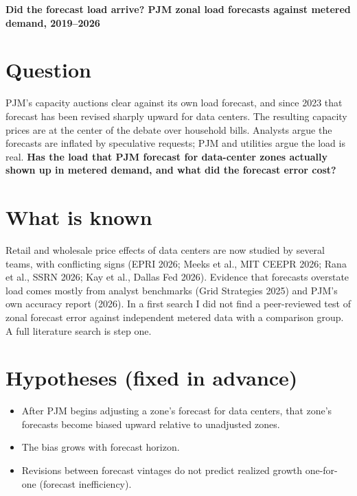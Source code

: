 \documentclass[10pt,a4paper]{article}
\begin{document}
\small
\begin{center}
{\large\bfseries Did the forecast load arrive? PJM zonal load forecasts against metered demand, 2019--2026\par}
\vspace{3pt}{\small Research plan, written before the analysis \quad$\cdot$\quad Sahil, MSE Data Science, Johns Hopkins University \quad$\cdot$\quad November 2026}
\end{center}

\section{Question}
PJM's capacity auctions clear against its own load forecast, and since 2023 that forecast has been revised sharply upward for data centers. The resulting capacity prices are at the center of the debate over household bills. Analysts argue the forecasts are inflated by speculative requests; PJM and utilities argue the load is real. \textbf{Has the load that PJM forecast for data-center zones actually shown up in metered demand, and what did the forecast error cost?}

\section{What is known}
Retail and wholesale price effects of data centers are now studied by several teams, with conflicting signs (EPRI 2026; Meeks et al., MIT CEEPR 2026; Rana et al., SSRN 2026; Kay et al., Dallas Fed 2026). Evidence that forecasts overstate load comes mostly from analyst benchmarks (Grid Strategies 2025) and PJM's own accuracy report (2026). In a first search I did not find a peer-reviewed test of zonal forecast error against independent metered data with a comparison group. A full literature search is step one.

\section{Hypotheses (fixed in advance)}
\begin{itemize}
\item[H1] After PJM begins adjusting a zone's forecast for data centers, that zone's forecasts become biased upward relative to unadjusted zones.
\item[H2] The bias grows with forecast horizon.
\item[H3] Revisions between forecast vintages do not predict realized growth one-for-one (forecast inefficiency).
\end{itemize}
\end{document}
